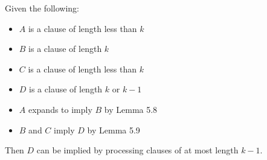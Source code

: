 \documentclass[manuscript]{acmart}
\begin{document}
    \begin{lemma}
        Given the following:
        \begin{itemize}
            \item $A$ is a clause of length less than $k$
            \item $B$ is a clause of length $k$
            \item $C$ is a clause of length less than $k$
            \item $D$ is a clause of length $k$ or $k - 1$
            \item $A$ expands to imply $B$ by Lemma 5.8
            \item $B$ and $C$ imply $D$ by Lemma 5.9
        \end{itemize}
        Then $D$ can be implied by processing clauses of at most length $k - 1$.
    \end{lemma}
\end{document}
